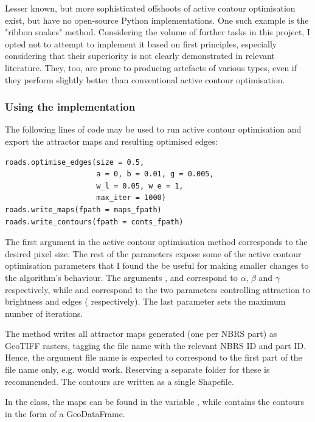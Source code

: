 Lesser known, but more sophisticated offshoots of active contour optimisation exist, but have no open-source Python implementations. One such example is the "ribbon snakes" method. Considering the volume of further tasks in this project, I opted not to attempt to implement it based on first principles, especially considering that their superiority is not clearly demonstrated in relevant literature. They, too, are prone to producing artefacts of various types, even if they perform slightly better than conventional active contour optimisation.

\subsubsection{Using the implementation}

The following lines of code may be used to run active contour optimisation and export the attractor maps and resulting optimised edges:

\begin{lstlisting}
roads.optimise_edges(size = 0.5,
                     a = 0, b = 0.01, g = 0.005,
                     w_l = 0.05, w_e = 1,
                     max_iter = 1000)
roads.write_maps(fpath = maps_fpath)
roads.write_contours(fpath = conts_fpath)
\end{lstlisting}

The first argument  in the active contour optimisation method corresponds to the desired pixel size. The rest of the parameters expose some of the active contour optimisation parameters that I found the be useful for making smaller changes to the algorithm's behaviour. The arguments ,  and  correspond to $\alpha$, $\beta$ and $\gamma$ respectively, while  and  correspond to the two parameters controlling attraction to brightness and edges (  respectively). The last parameter sets the maximum number of iterations.

The  method writes all attractor maps generated (one per NBRS part) as GeoTIFF rasters, tagging the file name with the relevant NBRS ID and part ID. Hence, the argument file name is expected to correspond to the first part of the file name only, e.g.  would work. Reserving a separate folder for these is recommended. The contours are written as a single Shapefile.

In the class, the maps can be found in the variable , while  contains the contours in the form of a GeoDataFrame.

